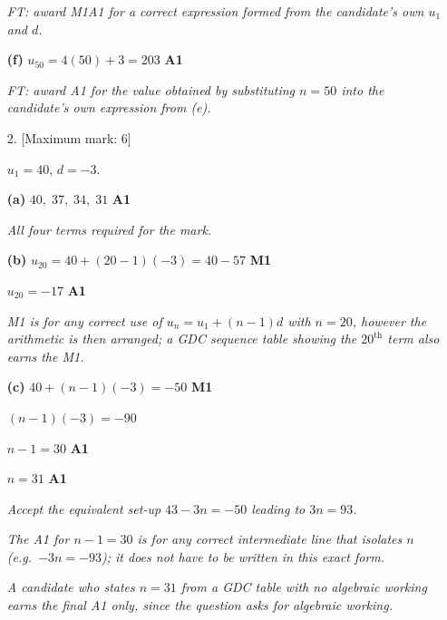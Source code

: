 \documentclass[12pt, twoside]{article}
\begin{document}
\begin{enumerate}[itemsep=0.3cm]
\emph{FT: award M1A1 for a correct expression formed from the
candidate's own $u_{1}$ and $d$.}

\medskip

\textbf{(f)} $u_{50} = 4(50) + 3 = 203$ \hfill \textbf{A1}

\emph{FT: award A1 for the value obtained by substituting $n = 50$
into the candidate's own expression from (e).}

\newpage

\item[2.] [Maximum mark: 6]

$u_{1} = 40$, $d = -3$.

\medskip

\textbf{(a)} $40,\; 37,\; 34,\; 31$ \hfill \textbf{A1}

\emph{All four terms required for the mark.}

\medskip

\textbf{(b)} $u_{20} = 40 + (20 - 1)(-3) = 40 - 57$ \hfill \textbf{M1}

$u_{20} = -17$ \hfill \textbf{A1}

\emph{M1 is for any correct use of $u_{n} = u_{1} + (n-1)d$ with
$n = 20$, however the arithmetic is then arranged; a GDC sequence
table showing the $20^{\text{th}}$ term also earns the M1.}

\medskip

\textbf{(c)} $40 + (n - 1)(-3) = -50$ \hfill \textbf{M1}

$(n - 1)(-3) = -90$

$n - 1 = 30$ \hfill \textbf{A1}

$n = 31$ \hfill \textbf{A1}

\emph{Accept the equivalent set-up $43 - 3n = -50$ leading to
$3n = 93$.}

\emph{The A1 for $n - 1 = 30$ is for any correct intermediate line
that isolates $n$ (e.g.\ $-3n = -93$); it does not have to be written
in this exact form.}

\emph{A candidate who states $n = 31$ from a GDC table with no
algebraic working earns the final A1 only, since the question asks
for algebraic working.}

\end{enumerate}
\end{document}
